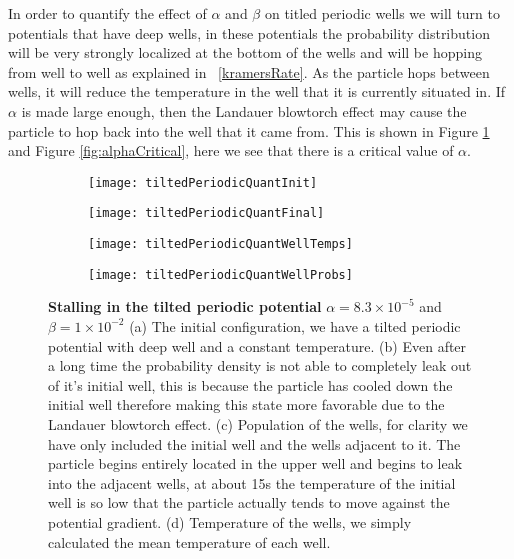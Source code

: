 In order to quantify the effect of $\alpha$ and $\beta$ on titled periodic wells we will turn to potentials that have deep wells, in these potentials the probability distribution will be very strongly localized at the bottom of the wells and will be hopping from well to well as explained in ~\autoref{kramersRate}. As the particle hops between wells, it will reduce the temperature in the well that it is currently situated in. If$\alpha$ is made large enough, then the Landauer blowtorch effect may cause the particle to hop back into the well that it came from. This is shown in Figure \ref{fig:tiltedPeriodicQuant} and Figure \ref{fig:alphaCritical}, here we see that there is a critical value of $\alpha$.
\begin{figure}
	\begin{subfigure}{0.49\textwidth}
		\texttt{[image: tiltedPeriodicQuantInit]}
		\caption{}
	\end{subfigure}
	\begin{subfigure}{0.49\textwidth}
		\texttt{[image: tiltedPeriodicQuantFinal]}
		\caption{}
	\end{subfigure}
	\begin{subfigure}{0.49\textwidth}
		\texttt{[image: tiltedPeriodicQuantWellTemps]}
		\caption{}
	\end{subfigure}
	\begin{subfigure}{0.49\textwidth}
		\texttt{[image: tiltedPeriodicQuantWellProbs]}
		\caption{}
	\end{subfigure}
	\caption{\textbf{Stalling in the tilted periodic potential} $\alpha = 8.3 \times 10^{-5}$ and $\beta = 1 \times 10^{-2}$ (a) The initial configuration, we have a tilted periodic potential with deep well and a constant temperature. (b) Even after a long time the probability density is not able to completely leak out of it's initial well, this is because the particle has cooled down the initial well therefore making this state more favorable due to the Landauer blowtorch effect. (c) Population of the wells, for clarity we have only included the initial well and the wells adjacent to it. The particle begins entirely located in the upper well and begins to leak into the adjacent wells, at about 15s the temperature of the initial well is so low that the particle actually tends to move against the potential gradient. (d) Temperature of the wells, we simply calculated the mean temperature of each well. \label{fig:tiltedPeriodicQuant}}
\end{figure}
